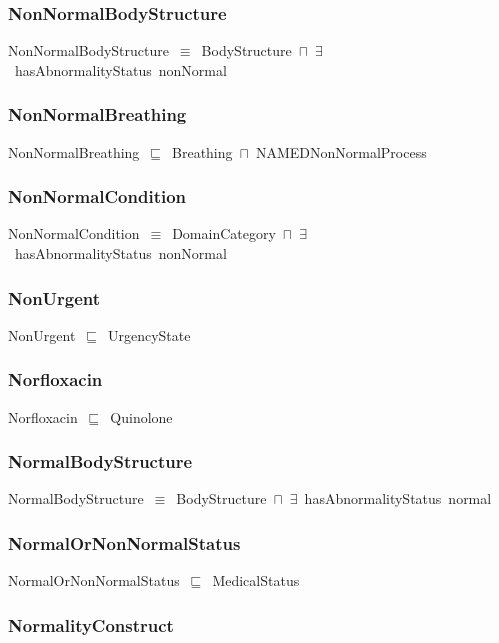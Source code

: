 \documentclass{article}
\begin{document}
\subsubsection*{NonNormalBodyStructure}

NonNormalBodyStructure~\ensuremath{\equiv}~BodyStructure~\ensuremath{\sqcap}~\ensuremath{\exists}~hasAbnormalityStatus~nonNormal

\subsubsection*{NonNormalBreathing}

NonNormalBreathing~\ensuremath{\sqsubseteq}~Breathing~\ensuremath{\sqcap}~NAMEDNonNormalProcess~

\subsubsection*{NonNormalCondition}

NonNormalCondition~\ensuremath{\equiv}~DomainCategory~\ensuremath{\sqcap}~\ensuremath{\exists}~hasAbnormalityStatus~nonNormal

\subsubsection*{NonUrgent}

NonUrgent~\ensuremath{\sqsubseteq}~UrgencyState~

\subsubsection*{Norfloxacin}

Norfloxacin~\ensuremath{\sqsubseteq}~Quinolone~

\subsubsection*{NormalBodyStructure}

NormalBodyStructure~\ensuremath{\equiv}~BodyStructure~\ensuremath{\sqcap}~\ensuremath{\exists}~hasAbnormalityStatus~normal

\subsubsection*{NormalOrNonNormalStatus}

NormalOrNonNormalStatus~\ensuremath{\sqsubseteq}~MedicalStatus~

\subsubsection*{NormalityConstruct}
\end{document}
